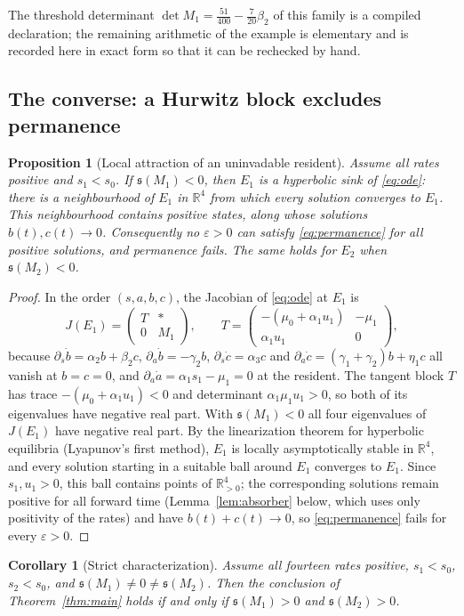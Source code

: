 \documentclass[11pt,a4paper]{article}
\theoremstyle{plain}
\newtheorem{proposition}[theorem]{Proposition}
\newtheorem{corollary}[theorem]{Corollary}
\theoremstyle{definition}
\theoremstyle{remark}
\newcommand{\R}{\mathbb R}
\newcommand{\spb}{\mathfrak s}
\newcommand{\eps}{\varepsilon}
\newcommand{\mat}[4]{\begin{pmatrix}#1&#2\\#3&#4\end{pmatrix}}
\begin{document}
The threshold determinant $\det M_1=\tfrac{51}{400}-\tfrac{7}{20}\beta_2$ of this family is a compiled declaration; the remaining arithmetic of the example is elementary and is recorded here in exact form so that it can be rechecked by hand.

\subsection{The converse: a Hurwitz block excludes permanence}

\begin{proposition}[Local attraction of an uninvadable resident]\label{prop:converse}
Assume all rates positive and $s_1<s_0$. If $\spb(M_1)<0$, then $E_1$ is a hyperbolic sink of \eqref{eq:ode}: there is a neighbourhood of $E_1$ in $\R^4$ from which every solution converges to $E_1$. This neighbourhood contains positive states, along whose solutions $b(t),c(t)\to0$. Consequently no $\eps>0$ can satisfy \eqref{eq:permanence} for all positive solutions, and permanence fails. The same holds for $E_2$ when $\spb(M_2)<0$.
\end{proposition}
\begin{proof}
In the order $(s,a,b,c)$, the Jacobian of \eqref{eq:ode} at $E_1$ is
\[
 J(E_1)=\begin{pmatrix}T&*\\0&M_1\end{pmatrix},\qquad
 T=\mat{-(\mu_0+\alpha_1u_1)}{-\mu_1}{\alpha_1u_1}{0},
\]
because $\partial_s\dot b=\alpha_2b+\beta_2c$, $\partial_a\dot b=-\gamma_2b$, $\partial_s\dot c=\alpha_3c$ and $\partial_a\dot c=(\gamma_1+\gamma_2)b+\eta_1c$ all vanish at $b=c=0$, and $\partial_a\dot a=\alpha_1s_1-\mu_1=0$ at the resident. The tangent block $T$ has trace $-(\mu_0+\alpha_1u_1)<0$ and determinant $\alpha_1\mu_1u_1>0$, so both of its eigenvalues have negative real part. With $\spb(M_1)<0$ all four eigenvalues of $J(E_1)$ have negative real part. By the linearization theorem for hyperbolic equilibria (Lyapunov's first method), $E_1$ is locally asymptotically stable in $\R^4$, and every solution starting in a suitable ball around $E_1$ converges to $E_1$. Since $s_1,u_1>0$, this ball contains points of $\R^4_{>0}$; the corresponding solutions remain positive for all forward time (Lemma~\ref{lem:absorber} below, which uses only positivity of the rates) and have $b(t)+c(t)\to0$, so \eqref{eq:permanence} fails for every $\eps>0$.
\end{proof}

\begin{corollary}[Strict characterization]\label{cor:characterization}
Assume all fourteen rates positive, $s_1<s_0$, $s_2<s_0$, and $\spb(M_1)\ne0\ne\spb(M_2)$. Then the conclusion of Theorem~\ref{thm:main} holds if and only if $\spb(M_1)>0$ and $\spb(M_2)>0$.
\end{corollary}
\end{document}
